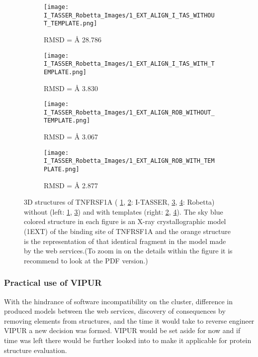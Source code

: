 	\begin{figure}[!ht]
		\centering
		\begin{subfigure}{0.49\textwidth}
			\texttt{[image: I\_TASSER\_Robetta\_Images/1\_EXT\_ALIGN\_I\_TAS\_WITHOUT\_TEMPLATE.png]}
			\caption{RMSD = {\AA} 28.786}
			\label{fig:RES_I_TASSER_Without}
		\end{subfigure}
		\begin{subfigure}{0.49\textwidth}
			\texttt{[image: I\_TASSER\_Robetta\_Images/1\_EXT\_ALIGN\_I\_TAS\_WITH\_TEMPLATE.png]}
			\caption{RMSD = {\AA} 3.830}
			\label{fig:RES_I_TASSER_With}
		\end{subfigure}
		\par\bigskip
		\begin{subfigure}{0.49\textwidth}
			\texttt{[image: I\_TASSER\_Robetta\_Images/1\_EXT\_ALIGN\_ROB\_WITHOUT\_TEMPLATE.png]}
			\caption{RMSD =  {\AA} 3.067}
			\label{fig:RES_Robetta_Without}
		\end{subfigure}
		\begin{subfigure}{0.49\textwidth}
			\texttt{[image: I\_TASSER\_Robetta\_Images/1\_EXT\_ALIGN\_ROB\_WITH\_TEMPLATE.png]}
			\caption{RMSD =  {\AA} 2.877}
			\label{fig:RES_Robetta_With}
		\end{subfigure}
		\caption[I-TASSER and Robetta models with and without templates]{3D structures of TNFRSF1A ( \ref{fig:RES_I_TASSER_Without}, \ref{fig:RES_I_TASSER_With}: I-TASSER, \ref{fig:RES_Robetta_Without}, \ref{fig:RES_Robetta_With}: Robetta) without (left: \ref{fig:RES_I_TASSER_Without}, \ref{fig:RES_Robetta_Without}) and with templates (right: \ref{fig:RES_I_TASSER_With}, \ref{fig:RES_Robetta_With}). The sky blue colored structure in each figure is an X-ray crystallographic model (1EXT) of the binding site of TNFRSF1A and the orange structure is the representation of that identical fragment in the model made by the web services.(To zoom in on the details within the figure it is recommend to look at the PDF version.)}
		\label{fig:I_Tasser_Robetta_models}
	\end{figure}
	\label{subsubsec:RES_Expanding_Models}
	
	\subsubsection{Practical use of VIPUR}
	With the hindrance of software incompatibility on the cluster, difference in produced models between the web services, discovery of consequences by removing elements from structures, and the time it would take to reverse engineer VIPUR a new decision was formed. VIPUR would be set aside for now and if time was left there would be further looked into to make it applicable for protein structure evaluation.

